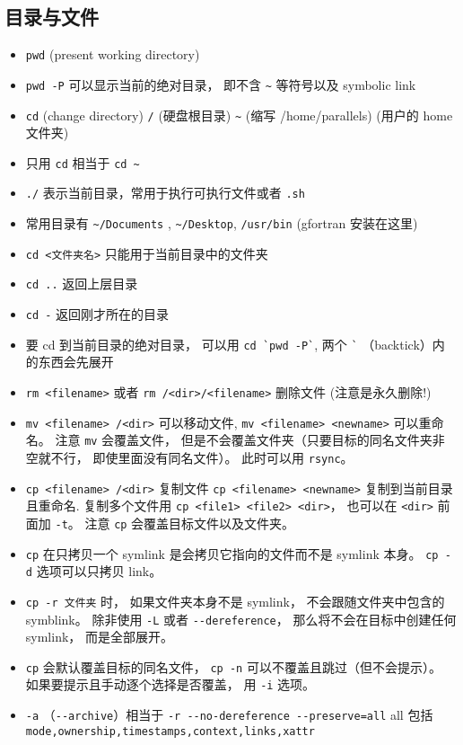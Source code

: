 \subsection{目录与文件}
\begin{itemize}
\item \verb`pwd` (present working directory)
\item \verb`pwd -P` 可以显示当前的绝对目录， 即不含 \verb`~` 等符号以及 symbolic link
\item \verb`cd` (change directory) \verb`/` (硬盘根目录) \verb`~` (缩写 /home/parallels) (用户的 home 文件夹)
\item 只用 \verb`cd` 相当于 \verb`cd ~`
\item \verb`./` 表示当前目录，常用于执行可执行文件或者 \verb`.sh`
\item 常用目录有 \verb`~/Documents` ,  \verb`~/Desktop`, \verb`/usr/bin` (gfortran 安装在这里)
\item \verb`cd <文件夹名>` 只能用于当前目录中的文件夹
\item \verb`cd ..` 返回上层目录
\item \verb`cd -` 返回刚才所在的目录
\item 要 cd 到当前目录的绝对目录， 可以用 \verb|cd `pwd -P`|, 两个 \verb|`| （backtick）内的东西会先展开
\item \verb`rm <filename>` 或者 \verb`rm /<dir>/<filename>` 删除文件  (注意是永久删除!)
\item \verb`mv <filename> /<dir>` 可以移动文件, \verb`mv <filename> <newname>` 可以重命名。 注意 \verb|mv| 会覆盖文件， 但是不会覆盖文件夹（只要目标的同名文件夹非空就不行， 即使里面没有同名文件）。 此时可以用 \verb|rsync|。
\item \verb`cp <filename> /<dir>` 复制文件 \verb`cp <filename> <newname>` 复制到当前目录且重命名. 复制多个文件用 \verb`cp <file1> <file2> <dir>`， 也可以在 \verb|<dir>| 前面加 \verb|-t|。 注意 \verb|cp| 会覆盖目标文件以及文件夹。
\item \verb|cp| 在只拷贝一个 symlink 是会拷贝它指向的文件而不是 symlink 本身。 \verb|cp -d| 选项可以只拷贝 link。
\item \verb|cp -r 文件夹| 时， 如果文件夹本身不是 symlink， 不会跟随文件夹中包含的 symblink。 除非使用 \verb|-L| 或者 \verb|--dereference|， 那么将不会在目标中创建任何 symlink， 而是全部展开。
\item \verb|cp| 会默认覆盖目标的同名文件， \verb|cp -n| 可以不覆盖且跳过（但不会提示）。 如果要提示且手动逐个选择是否覆盖， 用 \verb|-i| 选项。
\item \verb|-a| （\verb|--archive|）相当于 \verb|-r --no-dereference --preserve=all| all 包括 \verb|mode,ownership,timestamps,context,links,xattr|

\end{itemize}
